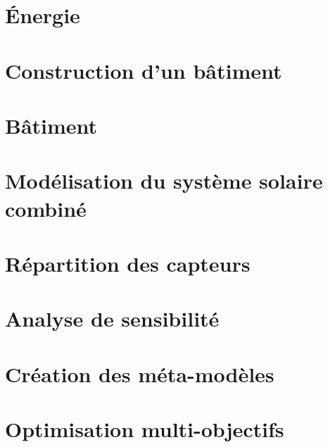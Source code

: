 \documentclass[11pt, oneside]{JeremyThesis}
\begin{document}
\begin{thesisAppendices}

\chapter{Énergie} %
\label{cha:energie}


\chapter{Construction d’un bâtiment} %
\label{cha:construction_batiment}


\chapter{Bâtiment} %
\label{cha:batiment}
\clearpage



\chapter{Modélisation du système solaire combiné} %
\label{cha:systeme_solaire}



\chapter{Répartition des capteurs} %
\label{cha:repartition_des_capteurs}


\chapter{Analyse de sensibilité} %
\label{cha:analyse_de_sensibilite}


\chapter{Création des méta-modèles} %
\label{cha:creation_des_meta_modeles}


\chapter{Optimisation multi-objectifs} %
\label{cha:optimisation_multi_objectifs}


\end{thesisAppendices}


\end{document}
